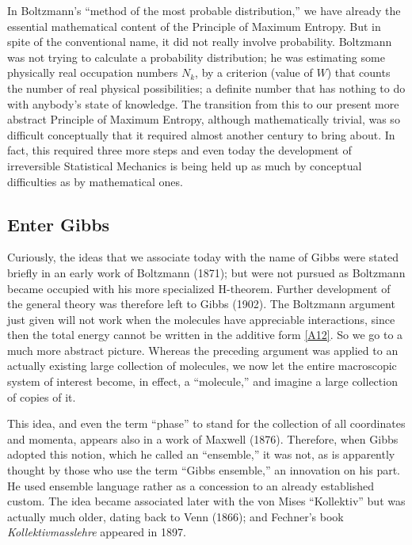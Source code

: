 In Boltzmann's ``method of the most probable distribution,'' we have already the essential mathematical content of the Principle of Maximum Entropy.
But in spite of the conventional name, it did not really involve probability.
Boltzmann was not trying to calculate a probability distribution; he was estimating some physically real occupation numbers $N_k$, by a criterion (value of $W$) that counts the number of real physical possibilities; a definite number that has nothing to do with anybody's state of knowledge.
The transition from this to our present more abstract Principle of Maximum Entropy, although mathematically trivial, was so difficult conceptually that it required almost another century to bring about.
In fact, this required three more steps and even today the development of irreversible Statistical Mechanics is being held up as much by conceptual difficulties as by mathematical ones.

\subsection*{Enter Gibbs}
Curiously, the ideas that we associate today with the name of Gibbs were stated briefly in an early work of Boltzmann (\cite{boltzmann}{1871}); but were not pursued as Boltzmann became occupied with his more specialized H-theorem.
Further development of the general theory was therefore left to Gibbs (\cite{gibbs}{1902}).
The Boltzmann argument just given will not work when the molecules have appreciable interactions, since then the total energy cannot be written in the additive form \eqref{A12}.
So we go to a much more abstract picture.
Whereas the preceding argument was applied to an actually existing large collection of molecules, we now let the entire macroscopic system of interest become, in effect, a ``molecule,'' and imagine a large collection of copies of it.


This idea, and even the term ``phase'' to stand for the collection of all coordinates and momenta, appears also in a work of Maxwell (\cite{maxwell76}{1876}).
Therefore, when Gibbs adopted this notion, which he called an ``ensemble,'' it was not, as is apparently thought by those who use the term ``Gibbs ensemble,'' an innovation on his part.
He used ensemble language rather as a concession to an already established custom.
The idea became associated later with the von Mises ``Kollektiv'' but was actually much older, dating back to Venn (\cite{venn}{1866}); and Fechner's book \emph{Kollektivmasslehre} appeared in 1897.

